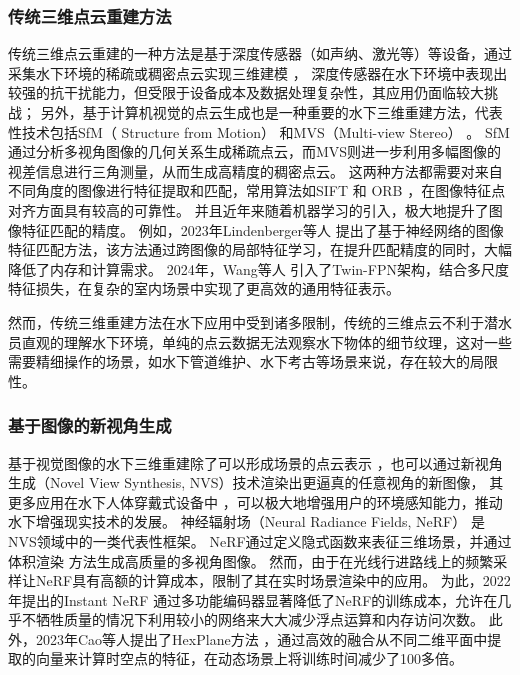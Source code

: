 \subsubsection{传统三维点云重建方法}
传统三维点云重建的一种方法是基于深度传感器（如声纳、激光等）等设备，通过采集水下环境的稀疏或稠密点云实现三维建模 \cite{sonar1}\cite{sonar2}，
深度传感器在水下环境中表现出较强的抗干扰能力，但受限于设备成本及数据处理复杂性，其应用仍面临较大挑战；
另外，基于计算机视觉的点云生成也是一种重要的水下三维重建方法，代表性技术包括SfM（ Structure from Motion）\cite{sfm1, sfm2} 和MVS（Multi-view Stereo） \cite{mvs}。
SfM通过分析多视角图像的几何关系生成稀疏点云，而MVS则进一步利用多幅图像的视差信息进行三角测量，从而生成高精度的稠密点云。
这两种方法都需要对来自不同角度的图像进行特征提取和匹配，常用算法如SIFT \cite{sift} 和 ORB \cite{orb}，在图像特征点对齐方面具有较高的可靠性。
并且近年来随着机器学习的引入，极大地提升了图像特征匹配的精度。
例如，2023年Lindenberger等人 \cite{lightglue} 提出了基于神经网络的图像特征匹配方法，该方法通过跨图像的局部特征学习，在提升匹配精度的同时，大幅降低了内存和计算需求。
2024年，Wang等人 \cite{enhancing-mvs} 引入了Twin-FPN架构，结合多尺度特征损失，在复杂的室内场景中实现了更高效的通用特征表示。

然而，传统三维重建方法在水下应用中受到诸多限制，传统的三维点云不利于潜水员直观的理解水下环境，单纯的点云数据无法观察水下物体的细节纹理，这对一些需要精细操作的场景，如水下管道维护、水下考古等场景来说，存在较大的局限性。


\subsubsection{基于图像的新视角生成}
基于视觉图像的水下三维重建除了可以形成场景的点云表示\cite{vision_recon} ，也可以通过新视角生成（Novel View Synthesis, NVS）技术渲染出更逼真的任意视角的新图像，
其更多应用在水下人体穿戴式设备中 \cite{Xia2023}\cite{underwater_perception}，可以极大地增强用户的环境感知能力，推动水下增强现实技术的发展。
神经辐射场（Neural Radiance Fields, NeRF） \cite{nerf}\cite{Mip_nerf360} 是NVS领域中的一类代表性框架。
NeRF通过定义隐式函数来表征三维场景，并通过体积渲染 \cite{volume_render} 方法生成高质量的多视角图像。
然而，由于在光线行进路线上的频繁采样让NeRF具有高额的计算成本，限制了其在实时场景渲染中的应用。
为此，2022年提出的Instant NeRF \cite{instant_nerf} 通过多功能编码器显著降低了NeRF的训练成本，允许在几乎不牺牲质量的情况下利用较小的网络来大大减少浮点运算和内存访问次数。
此外，2023年Cao等人提出了HexPlane方法 \cite{hex_plane}，通过高效的融合从不同二维平面中提取的向量来计算时空点的特征，在动态场景上将训练时间减少了100多倍。


